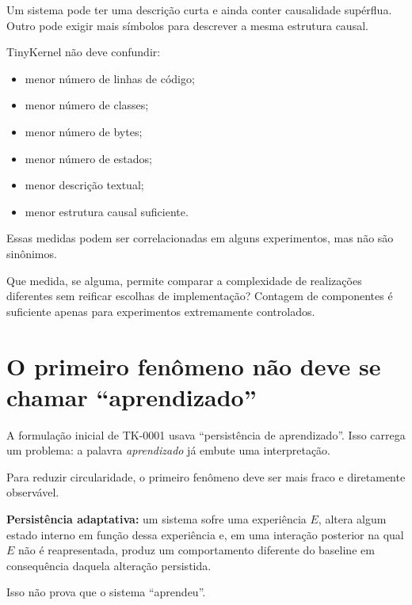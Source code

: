 \documentclass[11pt,a4paper]{article}
\begin{document}
Um sistema pode ter uma descrição curta e ainda conter causalidade supérflua.
Outro pode exigir mais símbolos para descrever a mesma estrutura causal.

TinyKernel não deve confundir:

\begin{itemize}
  \item menor número de linhas de código;
  \item menor número de classes;
  \item menor número de bytes;
  \item menor número de estados;
  \item menor descrição textual;
  \item menor estrutura causal suficiente.
\end{itemize}

Essas medidas podem ser correlacionadas em alguns experimentos, mas não são
sinônimos.

\begin{markerbox}
Que medida, se alguma, permite comparar a complexidade de realizações diferentes sem
reificar escolhas de implementação? Contagem de componentes é suficiente apenas para
experimentos extremamente controlados.
\end{markerbox}

\section{O primeiro fenômeno não deve se chamar “aprendizado”}

A formulação inicial de TK-0001 usava ``persistência de aprendizado''. Isso carrega
um problema: a palavra \emph{aprendizado} já embute uma interpretação.

Para reduzir circularidade, o primeiro fenômeno deve ser mais fraco e diretamente
observável.

\begin{thesisbox}
\textbf{Persistência adaptativa:}
um sistema sofre uma experiência \(E\), altera algum estado interno em função dessa
experiência e, em uma interação posterior na qual \(E\) não é reapresentada, produz
um comportamento diferente do baseline em consequência daquela alteração persistida.
\end{thesisbox}

Isso não prova que o sistema ``aprendeu''.
\end{document}
